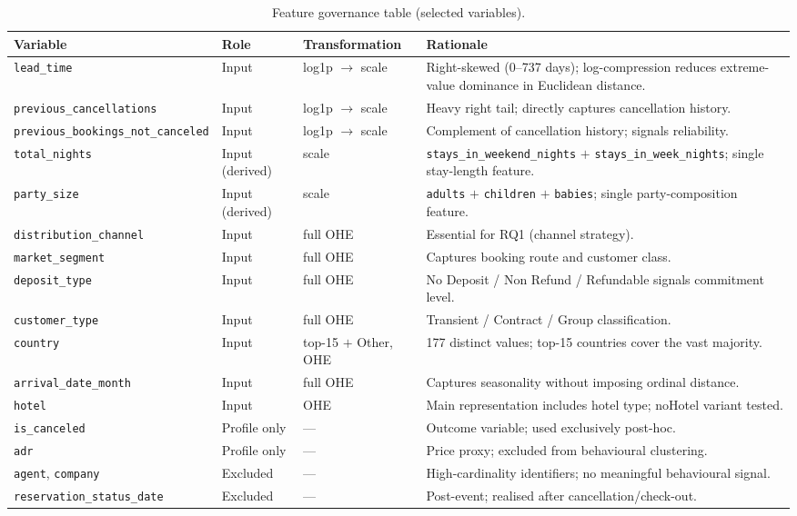 \documentclass[12pt,a4paper]{article}
\begin{document}
\begin{table}[H]
  \centering
  \caption{Feature governance table (selected variables).}
  \label{tab:feature_gov}
  \small
  \setlength{\tabcolsep}{4pt}
  \begin{tabular}{@{}L{6cm}L{1.5cm}L{2.7cm}L{6cm}@{}}
    \toprule
    \textbf{Variable} & \textbf{Role} & \textbf{Transformation} & \textbf{Rationale} \\
    \midrule
    \texttt{lead\_time}
      & Input & log1p $\to$ scale
      & Right-skewed (0--737 days); log-compression reduces extreme-value
        dominance in Euclidean distance. \\
    \texttt{previous\_cancellations}
      & Input & log1p $\to$ scale
      & Heavy right tail; directly captures cancellation history. \\
    \texttt{previous\_bookings\_not\_canceled}
      & Input & log1p $\to$ scale
      & Complement of cancellation history; signals reliability. \\
    \texttt{total\_nights}
      & Input (derived) & scale
      & \texttt{stays\_in\_weekend\_nights} $+$ \texttt{stays\_in\_week\_nights}; single stay-length feature. \\
    \texttt{party\_size}
      & Input (derived) & scale
      & \texttt{adults} $+$ \texttt{children} $+$ \texttt{babies}; single party-composition feature. \\
    \texttt{distribution\_channel}
      & Input & full OHE
      & Essential for RQ1 (channel strategy). \\
    \texttt{market\_segment}
      & Input & full OHE
      & Captures booking route and customer class. \\
    \texttt{deposit\_type}
      & Input & full OHE
      & No Deposit / Non Refund / Refundable signals commitment level. \\
    \texttt{customer\_type}
      & Input & full OHE
      & Transient / Contract / Group classification. \\
    \texttt{country}
      & Input & top-15 $+$ Other, OHE
      & 177 distinct values; top-15 countries cover the vast majority. \\
    \texttt{arrival\_date\_month}
      & Input & full OHE
      & Captures seasonality without imposing ordinal distance. \\
    \texttt{hotel}
      & Input & OHE
      & Main representation includes hotel type; noHotel variant tested. \\
    \texttt{is\_canceled}
      & Profile only & ---
      & Outcome variable; used exclusively post-hoc. \\
    \texttt{adr}
      & Profile only & ---
      & Price proxy; excluded from behavioural clustering. \\
    \texttt{agent}, \texttt{company}
      & Excluded & ---
      & High-cardinality identifiers; no meaningful behavioural signal. \\
    \texttt{reservation\_status\_date}
      & Excluded & ---
      & Post-event; realised after cancellation/check-out. \\
    \bottomrule
  \end{tabular}
\end{table}
\end{document}
